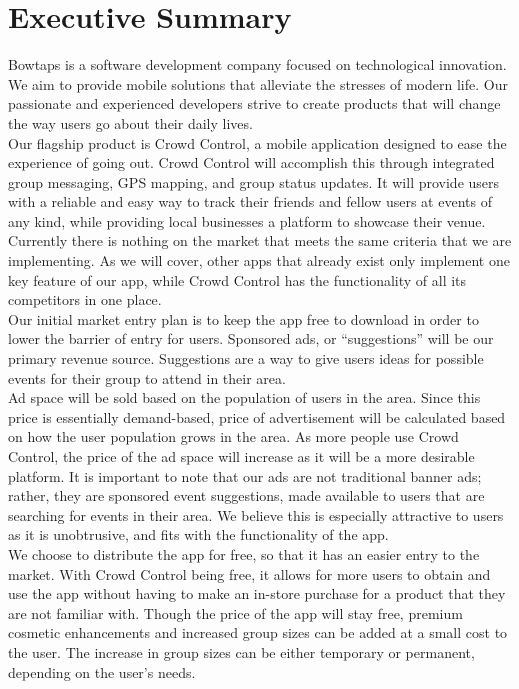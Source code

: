 

\chapter{Executive Summary}

Bowtaps is a software development company focused on technological innovation. We aim to provide mobile solutions that alleviate the stresses of modern life. Our passionate and experienced developers strive to create products that will change the way users go about their daily lives. \\

 Our flagship product is Crowd Control, a mobile application designed to ease the experience of going out. Crowd Control will accomplish this through integrated group messaging, GPS mapping, and group status updates. It will provide users with a reliable and easy way to track their friends and fellow users at events of any kind, while providing local businesses a platform to showcase their venue. \\
 
 Currently there is nothing on the market that meets the same criteria that we are implementing. As we will cover, other apps that already exist only implement one key feature of our app, while Crowd Control has the functionality of all its competitors in one place.\\
 
Our initial market entry plan is to keep the app free to download in order to lower the barrier of entry for users. Sponsored ads, or “suggestions” will be our primary revenue source. Suggestions are a way to give users ideas for possible events for their group to attend in their area.\\

Ad space will be sold based on the population of users in the area. Since this price is essentially demand-based, price of advertisement will be calculated based on how the user population grows in the area. As more people use Crowd Control, the price of the ad space will increase as it will be a more desirable platform. It is important to note that our ads are not traditional banner ads; rather, they are sponsored event suggestions, made available to users that are searching for events in their area. We believe this is especially attractive to users as it is unobtrusive, and fits with the functionality of the app.\\

We choose to distribute the app for free, so that it has an easier entry to the market. With Crowd Control being free, it allows for more users to obtain and use the app without having to make an in-store purchase for a product that they are not familiar with. Though the price of the app will stay free, premium cosmetic enhancements and increased group sizes can be added at a small cost to the user. The increase in group sizes can be either temporary or permanent, depending on the user's needs.\\

